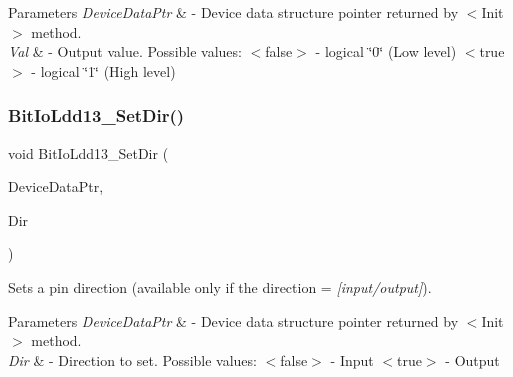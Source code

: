 \begin{DoxyParams}{Parameters}
{\em Device\+Data\+Ptr} & -\/ Device data structure pointer returned by $<$\+Init$>$ method. \\
\hline
{\em Val} & -\/ Output value. Possible values\+: $<$false$>$ -\/ logical \char`\"{}0\char`\"{} (Low level) $<$true$>$ -\/ logical \char`\"{}1\char`\"{} (High level) \\
\hline
\end{DoxyParams}
\mbox{\label{group___bit_io_ldd13__module_gaa510bc6987ce93bf7a866b1766f1a382}} 
\subsubsection{\texorpdfstring{Bit\+Io\+Ldd13\+\_\+\+Set\+Dir()}{BitIoLdd13\_SetDir()}}
{\footnotesize\ttfamily void Bit\+Io\+Ldd13\+\_\+\+Set\+Dir (\begin{DoxyParamCaption}\item[{\hyperlink{group___p_e___types__module_gac5cf1362f1f0e3a2ce71b1bf2276d091}{L\+D\+D\+\_\+\+T\+Device\+Data} $\ast$}]{Device\+Data\+Ptr,  }\item[{\hyperlink{group___p_e___types__module_ga97a80ca1602ebf2303258971a2c938e2}{bool}}]{Dir }\end{DoxyParamCaption})}



Sets a pin direction (available only if the direction = {\itshape \mbox{[}input/output\mbox{]}}). 


\begin{DoxyParams}{Parameters}
{\em Device\+Data\+Ptr} & -\/ Device data structure pointer returned by $<$\+Init$>$ method. \\
\hline
{\em Dir} & -\/ Direction to set. Possible values\+: $<$false$>$ -\/ Input $<$true$>$ -\/ Output \\
\hline
\end{DoxyParams}
\mbox{\label{group___bit_io_ldd13__module_gac89f06fe1f95f685923b6f13ab290526}} 
